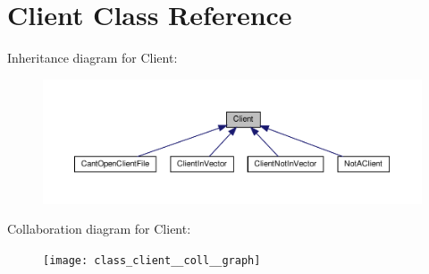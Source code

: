 \hypertarget{class_client}{}\section{Client Class Reference}
\label{class_client}


Inheritance diagram for Client\+:\nopagebreak
\begin{figure}[H]
\begin{center}
\leavevmode
\includegraphics[width=350pt]{class_client__inherit__graph}
\end{center}
\end{figure}


Collaboration diagram for Client\+:\nopagebreak
\begin{figure}[H]
\begin{center}
\leavevmode
\texttt{[image: class\_client\_\_coll\_\_graph]}
\end{center}
\end{figure}
